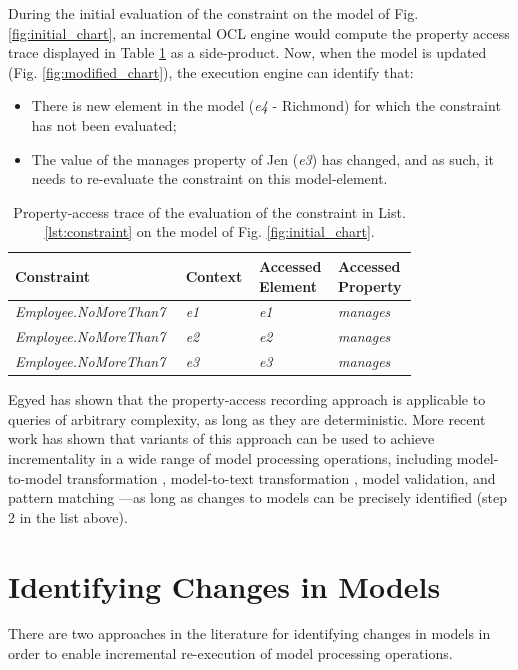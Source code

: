 \documentclass[conference]{IEEEtran}
\begin{document}
During the initial evaluation of the constraint on the model of Fig. \ref{fig:initial_chart}, an incremental OCL engine would compute the property access trace displayed in Table \ref{tab:property_access_trace} as a side-product. Now, when the model is updated (Fig. \ref{fig:modified_chart}), the execution engine can identify that:

\begin{itemize}
\item There is new element in the model (\emph{e4} - Richmond) for which the constraint has not been evaluated;
\item The value of the manages property of Jen (\emph{e3}) has changed, and as such, it needs to re-evaluate the constraint on this model-element.
\end{itemize}

\begin{table}[htbp]
\centering
\caption{Property-access trace of the evaluation of the constraint in List. \ref{lst:constraint} on the model of Fig. \ref{fig:initial_chart}.}
\begin{tabular}{p{0.35\linewidth} p{0.15\linewidth} p{0.15\linewidth} p{0.15\linewidth}}
\hline 
\textbf{Constraint} & \textbf{Context} & \textbf{Accessed Element} & \textbf{Accessed Property} \\ 
\hline 
\emph{Employee.NoMoreThan7}  & \emph{e1} & \emph{e1} & \emph{manages} \\ 
\emph{Employee.NoMoreThan7}  & \emph{e2} & \emph{e2} & \emph{manages} \\ 
\emph{Employee.NoMoreThan7}  & \emph{e3} & \emph{e3} & \emph{manages} \\ 
\hline 
\end{tabular} 
\label{tab:property_access_trace}
\end{table}

Egyed has shown that the property-access recording approach is applicable to queries of arbitrary complexity, as long as they are deterministic. More recent work has shown that variants of this approach can be used to achieve incrementality in a wide range of model processing operations, including model-to-model transformation \cite{jouault2010towards}, model-to-text transformation \cite{ogunyomi2015property}, model validation, and pattern matching \cite{rath2012derived}---as long as changes to models can be precisely identified (step 2 in the list above).

\section{Identifying Changes in Models}
\label{sec:identifying_changes_in models}
There are two approaches in the literature for identifying changes in models in order to enable incremental re-execution of model processing operations.
\end{document}
